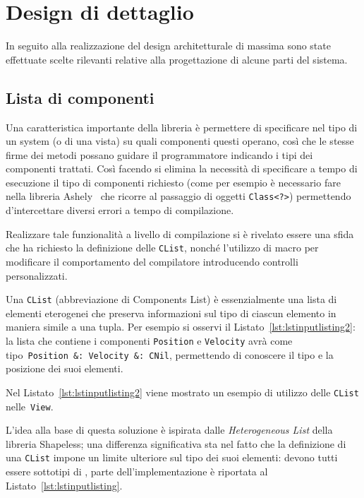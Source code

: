 \chapter{Design di dettaglio}\label{ch:design-di-dettaglio}
In seguito alla realizzazione del design architetturale di massima sono state effettuate scelte rilevanti
relative alla progettazione di alcune parti del sistema.

\section{Lista di componenti}\label{sec:lista-di-componenti}
Una caratteristica importante della libreria è permettere di specificare nel tipo di un system (o di una vista)
su quali componenti questi operano, così che le stesse firme dei metodi possano guidare il programmatore indicando i
tipi dei componenti trattati.
Così facendo si elimina la necessità di specificare a tempo di esecuzione il tipo di componenti richiesto (come per
esempio è necessario fare nella libreria Ashely~\cite{ashley} che ricorre al passaggio di oggetti \texttt{Class<?>})
permettendo d'intercettare diversi errori a tempo di compilazione.

Realizzare tale funzionalità a livello di compilazione si è rivelato essere una sfida che ha richiesto la definizione
delle \texttt{CList}, nonché l’utilizzo di macro per modificare il comportamento del compilatore introducendo controlli
personalizzati.

Una \texttt{CList} (abbreviazione di Components List) è essenzialmente una lista di elementi eterogenei che preserva
informazioni sul tipo di ciascun elemento in maniera simile a una tupla.
Per esempio si osservi il Listato~\ref{lst:lstinputlisting2}: la lista che contiene
i componenti \texttt{Position} e \texttt{Velocity} avrà come tipo~\texttt{Position~\&:~Velocity~\&:~CNil}, permettendo
di conoscere il tipo e la posizione dei suoi elementi.

Nel Listato~\ref{lst:lstinputlisting2} viene mostrato un esempio di utilizzo delle \texttt{CList} nelle~\texttt{View}.


L’idea alla base di questa soluzione è ispirata dalle \textit{Heterogeneous List} della libreria
Shapeless\cite{shapeless}; una differenza significativa sta nel fatto che la definizione di una \texttt{CList} impone un
limite ulteriore sul tipo dei suoi elementi: devono tutti essere sottotipi di \Component, parte dell’implementazione è
riportata al Listato~\ref{lst:lstinputlisting}.

